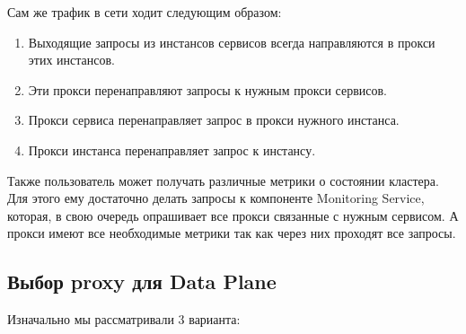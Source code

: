 Сам же трафик в сети ходит следующим образом:
\begin{enumerate}
	\item Выходящие запросы из инстансов сервисов всегда направляются в прокси этих инстансов.
	\item Эти прокси перенаправляют запросы к нужным прокси сервисов.
	\item Прокси сервиса перенаправляет запрос в прокси нужного инстанса.
	\item Прокси инстанса перенаправляет запрос к инстансу.
\end{enumerate}

Также пользователь может получать различные метрики о состоянии кластера. Для этого ему достаточно делать запросы к компоненте Monitoring Service, которая, в свою очередь опрашивает все прокси связанные с нужным сервисом. А прокси имеют все необходимые метрики так как через них проходят все запросы.
\subsection{Выбор proxy для Data Plane}

Изначально мы рассматривали 3 варианта:

